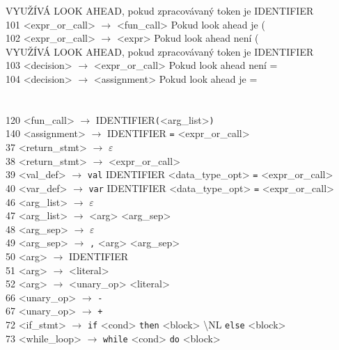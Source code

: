 \documentclass[10pt,a4paper]{article}
\begin{document}
VYUŽÍVÁ LOOK AHEAD, pokud zpracovávaný token je IDENTIFIER\\
101 <expr\_or\_call> $\to$ <fun\_call>   \hspace{0.7cm}   Pokud look ahead je (\\
102 <expr\_or\_call> $\to$ <expr>   \hspace{0.7cm}   Pokud look ahead není (\\

VYUŽÍVÁ LOOK AHEAD, pokud zpracovávaný token je IDENTIFIER\\
103 <decision> $\to$ <expr\_or\_call> \hspace{0.7cm}  Pokud look ahead není =\\
104 <decision> $\to$ <assignment> \hspace{0.7cm}  Pokud look ahead je =\\
\\
\\

120 <fun\_call> $\to$ IDENTIFIER\texttt{(}<arg\_list>\texttt{)}\\
140 <assignment> $\to$ IDENTIFIER \texttt{=} <expr\_or\_call>\\

37 <return\_stmt> $\to$ $\varepsilon$\\
38 <return\_stmt> $\to$ <expr\_or\_call>\\
39 <val\_def> $\to$ \texttt{val} IDENTIFIER <data\_type\_opt> \texttt{=} <expr\_or\_call>\\
40 <var\_def> $\to$ \texttt{var} IDENTIFIER <data\_type\_opt> \texttt{=} <expr\_or\_call>\\

46 <arg\_list> $\to$ $\varepsilon$\\
47 <arg\_list> $\to$ <arg> <arg\_sep>\\
48 <arg\_sep> $\to$ $\varepsilon$\\
49 <arg\_sep> $\to$ \texttt{,} <arg> <arg\_sep>\\
50 <arg> $\to$ IDENTIFIER\\
51 <arg> $\to$ <literal>\\
52 <arg> $\to$ <unary\_op> <literal>\\

66 <unary\_op> $\to$ \texttt{-}\\
67 <unary\_op> $\to$ \texttt{+}\\

72 <if\_stmt> $\to$ \texttt{if} <cond> \texttt{then} <block> \textbackslash NL 
\texttt{else} <block>\\
73 <while\_loop> $\to$ \texttt{while} <cond> \texttt{do} <block>\\
\end{document}
